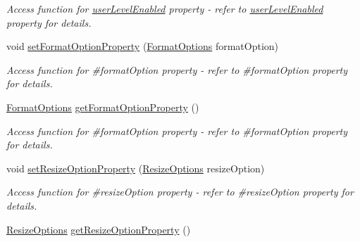 \begin{DoxyCompactItemize}
\begin{DoxyCompactList}\small\item\em Access function for \hyperlink{classQEImage_a25b8ba9d335dce7a4fd1eb9de3c62446}{userLevelEnabled} property -\/ refer to \hyperlink{classQEImage_a25b8ba9d335dce7a4fd1eb9de3c62446}{userLevelEnabled} property for details. \end{DoxyCompactList}\item 
\hypertarget{classQEImage_aae6230c403331e1cae93958bfb7608c4}{
void \hyperlink{classQEImage_aae6230c403331e1cae93958bfb7608c4}{setFormatOptionProperty} (\hyperlink{classQEImage_a6595b537ab12bff146c508d0fcb3ae3b}{FormatOptions} formatOption)}
\label{classQEImage_aae6230c403331e1cae93958bfb7608c4}

\begin{DoxyCompactList}\small\item\em Access function for \#formatOption property -\/ refer to \#formatOption property for details. \end{DoxyCompactList}\item 
\hypertarget{classQEImage_a830d8c733845de012ec5404a4d6732a5}{
\hyperlink{classQEImage_a6595b537ab12bff146c508d0fcb3ae3b}{FormatOptions} \hyperlink{classQEImage_a830d8c733845de012ec5404a4d6732a5}{getFormatOptionProperty} ()}
\label{classQEImage_a830d8c733845de012ec5404a4d6732a5}

\begin{DoxyCompactList}\small\item\em Access function for \#formatOption property -\/ refer to \#formatOption property for details. \end{DoxyCompactList}\item 
\hypertarget{classQEImage_a8fe57e00de03b03d74c0f625b908bfea}{
void \hyperlink{classQEImage_a8fe57e00de03b03d74c0f625b908bfea}{setResizeOptionProperty} (\hyperlink{classQEImage_af9f3e6c8c2bbadf453a2354e7b14c615}{ResizeOptions} resizeOption)}
\label{classQEImage_a8fe57e00de03b03d74c0f625b908bfea}

\begin{DoxyCompactList}\small\item\em Access function for \#resizeOption property -\/ refer to \#resizeOption property for details. \end{DoxyCompactList}\item 
\hypertarget{classQEImage_a3d827adc9aa1986d5ac1d8528e74526c}{
\hyperlink{classQEImage_af9f3e6c8c2bbadf453a2354e7b14c615}{ResizeOptions} \hyperlink{classQEImage_a3d827adc9aa1986d5ac1d8528e74526c}{getResizeOptionProperty} ()}
\label{classQEImage_a3d827adc9aa1986d5ac1d8528e74526c}


\end{DoxyCompactItemize}
